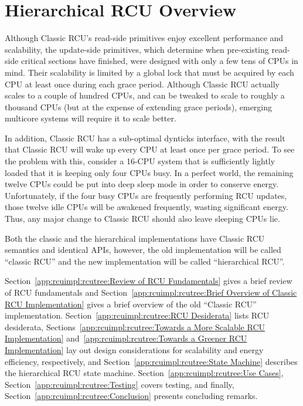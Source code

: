 
\section{Hierarchical RCU Overview}
\label{app:rcuimpl:rcutree:Hierarchical RCU Overview}

Although Classic RCU's read-side primitives enjoy excellent
performance and scalability, the update-side primitives, which
determine when pre-existing read-side critical sections have
finished, were designed with only a few tens of CPUs in mind.
Their scalability is limited by a global lock that must be
acquired by each CPU at least once during each grace period.
Although Classic RCU actually scales to a couple of hundred CPUs, and
can be tweaked to scale to roughly a thousand CPUs (but at the expense of
extending grace periods), emerging multicore systems will require
it to scale better.

In addition, Classic RCU has a sub-optimal dynticks interface,
with the result that Classic RCU will wake up every CPU at least
once per grace period.
To see the problem with this, consider a 16-CPU system that
is sufficiently lightly loaded that it is keeping only four
CPUs busy.
In a perfect world, the remaining twelve CPUs could be put into
deep sleep mode in order to conserve energy.
Unfortunately, if the four busy CPUs are frequently performing
RCU updates, those twelve idle CPUs will be awakened frequently,
wasting significant energy.
Thus, any major change to Classic RCU should also leave sleeping CPUs lie.

Both the classic and the hierarchical implementations
have Classic RCU semantics and identical APIs, however,
the old implementation will be called ``classic RCU''
and the new implementation will be called ``hierarchical RCU''.

Section~\ref{app:rcuimpl:rcutree:Review of RCU Fundamentals}
gives a brief review of RCU fundamentals and
Section~\ref{app:rcuimpl:rcutree:Brief Overview of Classic RCU Implementation}
gives a brief overview of the old ``Classic RCU'' implementation.
Section~\ref{app:rcuimpl:rcutree:RCU Desiderata}
lists RCU desiderata,
Sections~\ref{app:rcuimpl:rcutree:Towards a More Scalable RCU Implementation}
and~\ref{app:rcuimpl:rcutree:Towards a Greener RCU Implementation}
lay out design considerations for scalability and energy efficiency,
respectively, and
Section~\ref{app:rcuimpl:rcutree:State Machine}
describes the hierarchical RCU state machine.
Section~\ref{app:rcuimpl:rcutree:Use Cases},
Section~\ref{app:rcuimpl:rcutree:Testing}
covers testing, and finally,
Section~\ref{app:rcuimpl:rcutree:Conclusion}
presents concluding remarks.

